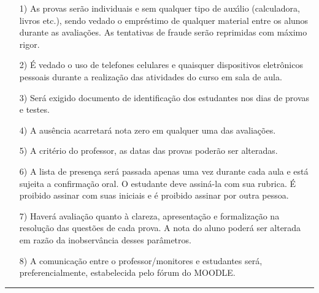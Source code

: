 \documentclass[12pt]{article}
\begin{document}
\begin{itemize}
\item[1)] As provas ser\~{a}o individuais e sem qualquer tipo de
aux\'{\i}lio (calculadora, livros etc.), sendo vedado o empr\'{e}stimo de
qualquer material entre os alunos durante as avalia\c{c}\~{o}es. As
tentativas de fraude ser\~{a}o reprimidas com m\'{a}ximo rigor.
\vspace{-0.25cm}

\item[2)] \'{E} vedado o uso de telefones celulares e quaisquer dispositivos eletr\^{o}nicos pessoais durante a realiza\c{c}\~{a}o das atividades do curso em sala de aula. \vspace{-0.25cm}

\item[3)] Ser\'{a} exigido documento de identifica\c{c}\~{a}o dos estudantes nos
dias de provas e testes. \vspace{-0.25cm}

\item[4)] A aus\^{e}ncia acarretar\'{a} nota zero em qualquer uma das
avalia\c{c}\~{o}es. \vspace{-0.25cm}

\item[5)] A crit\'{e}rio do professor, as datas das provas poder\~{a}o
ser alteradas. \vspace{-0.25cm}

\item[6)] A lista de presen\c{c}a ser\'{a} passada apenas uma vez
durante cada aula e est\'{a} sujeita a confirma\c{c}\~{a}o oral. O
estudante deve assin\'{a}-la com sua rubrica. {\'E} proibido assinar
com suas iniciais e \'{e} proibido assinar por outra pessoa.
\vspace{-0.25cm}

\item[7)] Haver{\'a} avalia{\c c}{\~a}o quanto {\`a} clareza, apresenta{\c
c}{\~a}o e formaliza{\c c}{\~a}o na  resolu{\c c}{\~a}o das quest{\~o}es de
cada prova. A nota do aluno poder{\'a} ser alterada em raz{\~a}o da
inobserv{\^a}ncia desses par{\^a}metros.

\item[8)] A comunica\c{c}\~ao entre o professor/monitores e estudantes ser\'a, preferencialmente,
 estabelecida pelo f\'orum do MOODLE.
\end{itemize}

\vfill
\hrule
\end{document}
